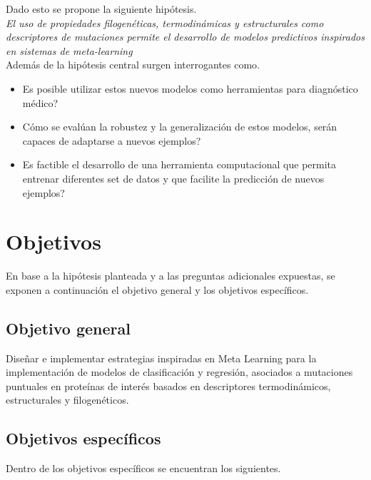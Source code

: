 Dado esto se propone la siguiente hipótesis.\\

\textit{El uso de propiedades filogenéticas, termodinámicas y estructurales como descriptores de mutaciones permite el desarrollo de modelos predictivos inspirados en sistemas de meta-learning}\\

Además de la hipótesis central surgen interrogantes como.

\begin{itemize}
	
	\item Es posible utilizar estos nuevos modelos como herramientas para diagnóstico médico?
	\item Cómo se evalúan la robustez y la generalización de estos modelos, serán capaces de adaptarse a nuevos ejemplos?
	\item Es factible el desarrollo de una herramienta computacional que permita entrenar diferentes set de datos y que facilite la predicción de nuevos ejemplos?
	
\end{itemize}

\section{Objetivos}

En base a la hipótesis planteada y a las preguntas adicionales expuestas, se exponen a continuación el objetivo general y los objetivos específicos.

\subsection{Objetivo general}

Diseñar e implementar estrategias inspiradas en Meta Learning para la implementación de modelos de clasificación y regresión, asociados a mutaciones puntuales en proteínas de interés basados en descriptores termodinámicos, estructurales y filogenéticos.

\subsection{Objetivos específicos}

Dentro de los objetivos específicos se encuentran los siguientes.

